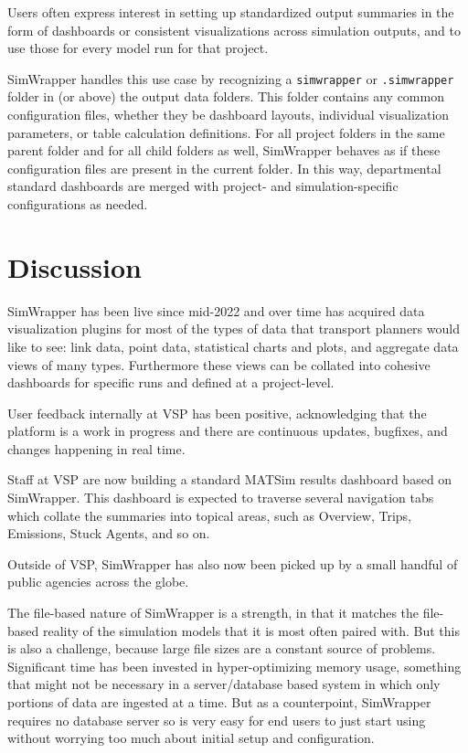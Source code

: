 Users often express interest in setting up standardized output summaries in the form of dashboards or consistent visualizations across simulation outputs, and to use those for every model run for that project.

SimWrapper handles this use case by recognizing a \texttt{simwrapper} or \texttt{.simwrapper} folder in (or above) the output data folders. This folder contains any common configuration files, whether they be dashboard layouts, individual visualization parameters, or table calculation definitions. For all project folders in the same parent folder and for all child folders as well, SimWrapper behaves as if these configuration files are present in the current folder. In this way, departmental standard dashboards are merged with project- and simulation-specific configurations as needed.


\hypertarget{simwrapper-discussion}{%
\section{Discussion}\label{simwrapper-discussion}}

SimWrapper has been live since mid-2022 and over time has acquired data visualization plugins for most of the types of data that transport planners would like to see: link data, point data, statistical charts and plots, and aggregate data views of many types. Furthermore these views can be collated into cohesive dashboards for specific runs and defined at a project-level.

User feedback internally at VSP has been positive, acknowledging that the platform is a work in progress and there are continuous updates, bugfixes, and changes happening in real time.

Staff at VSP are now building a standard MATSim results dashboard based on SimWrapper. This dashboard is expected to traverse several navigation tabs which collate the summaries into topical areas, such as Overview, Trips, Emissions, Stuck Agents, and so on.

Outside of VSP, SimWrapper has also now been picked up by a small handful of public agencies across the globe.

The file-based nature of SimWrapper is a strength, in that it matches the file-based reality of the simulation models that it is most often paired with. But this is also a challenge, because large file sizes are a constant source of problems. Significant time has been invested in hyper-optimizing memory usage, something that might not be necessary in a server/database based system in which only portions of data are ingested at a time. But as a counterpoint, SimWrapper requires no database server so is very easy for end users to just start using without worrying too much about initial setup and configuration.

